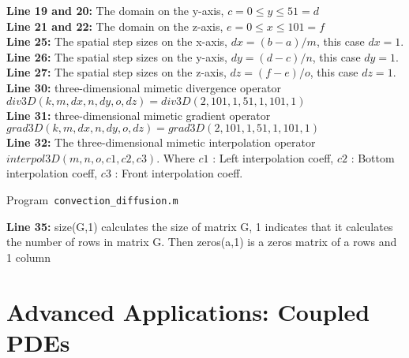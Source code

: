 \textbf{Line 19 and 20:} The domain on the  y-axis, $c=0 \leq y \leq 51=d$\\

\textbf{Line 21 and 22:} The domain on the  z-axis, $e=0 \leq x \leq 101=f$\\

\textbf{Line 25:} The spatial step sizes on the x-axis, $ dx = (b-a)/m$, this case $dx = 1$.\\

\textbf{Line 26:} The spatial step sizes on the y-axis, $ dy = (d-c)/n$, this case $dy = 1$.\\

\textbf{Line 27:} The spatial step sizes on the z-axis, $ dz = (f-e)/o$, this case $dz = 1$.\\

\textbf{Line 30:} three-dimensional mimetic divergence operator $div3D(k,m,dx,n,dy,o,dz)=div3D(2,101,1,51,1,101,1)$\\

\textbf{Line 31:} three-dimensional mimetic gradient operator $grad3D(k,m,dx,n,dy,o,dz)=grad3D(2,101,1,51,1,101,1)$\\

\textbf{Line 32:} The three-dimensional mimetic interpolation operator
$interpol3D(m, n, o, c1, c2, c3)$.  Where $c1$ : Left interpolation coeff, $c2$ : Bottom interpolation coeff, $c3$ : Front interpolation coeff.\\

\begin{listing}[ht!]
	\tiny
	\centering
	\caption{Program~\texttt{convection\_diffusion.m}}
	\label{code:convection_diffusion.m}
\end{listing}

\textbf{Line 35:} size(G,1) calculates the size of matrix G, 1 indicates that it calculates the number of rows in matrix G. Then zeros(a,1) is a zeros matrix of a rows and 1 column







\section{Advanced Applications: Coupled PDEs}
